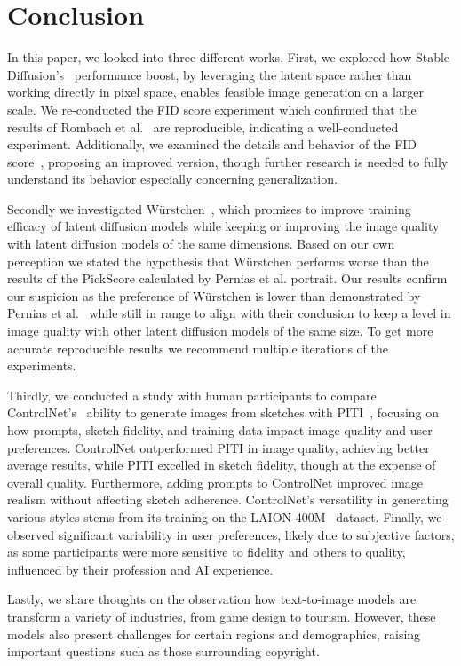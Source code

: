 \section{Conclusion}
In this paper, we looked into three different works. First, we explored how
Stable Diffusion's~\cite{rombach2022stablediffusion} performance boost, by
leveraging the latent space rather than working directly in pixel space,
enables feasible image generation on a larger scale. We re-conducted the FID
score experiment which confirmed that the results of Rombach et
al.~\cite{rombach2022stablediffusion} are reproducible, indicating a
well-conducted experiment. Additionally, we examined the details and behavior
of the FID score~\cite{heusel2018ganstrainedtimescaleupdate}, proposing an
improved version, though further research is needed to fully understand its
behavior especially concerning generalization.

Secondly we investigated W\"urstchen~\cite{pernias2024wrstchen}, which promises
to improve training efficacy of latent diffusion models while keeping or
improving the image quality with latent diffusion models of the same dimensions.
Based on our own perception we stated the hypothesis that W\"urstchen performs
worse than the results of the PickScore calculated by Pernias et al. portrait.
Our results confirm our suspicion as the preference of W\"urstchen is lower
than demonstrated by Pernias et al.~\cite{pernias2024wrstchen} while still in
range to align with their conclusion to keep a level in image quality with
other latent diffusion models of the same size. To get more accurate
reproducible results we recommend multiple iterations of the experiments.

Thirdly, we conducted a study with human participants to compare
ControlNet's~\cite{zhang2023addingconditionalcontroltexttoimage} ability to
generate images from sketches with
PITI~\cite{wang2022pretrainingneedimagetoimagetranslation}, focusing on how
prompts, sketch fidelity, and training data impact image quality and user
preferences. ControlNet outperformed PITI in image quality, achieving
better average results, while PITI excelled in sketch fidelity, though at the
expense of overall quality. Furthermore, adding prompts to ControlNet improved
image realism without affecting sketch adherence. ControlNet's versatility in
generating various styles stems from its training on the
LAION-400M~\cite{schuhmann2021laion400mopendatasetclipfiltered} dataset.
Finally, we observed significant variability in user preferences, likely due to
subjective factors, as some participants were more sensitive to fidelity and
others to quality, influenced by their profession and AI experience.

Lastly, we share thoughts on the observation how text-to-image models are
transform a variety of industries, from game design to tourism. However,
these models also present challenges for certain regions and demographics,
raising important questions such as those surrounding copyright.